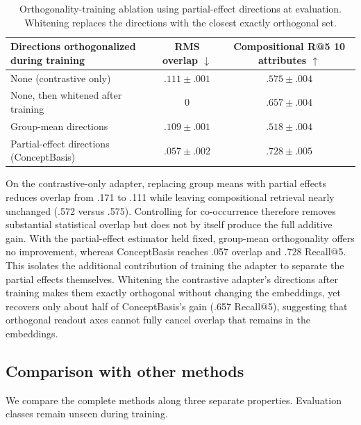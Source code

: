 \documentclass[mlmain,onecolumn]{jmlr}
\begin{document}
\begin{table}[h!]
  \centering
  \caption{Orthogonality-training ablation using partial-effect directions at evaluation. Whitening replaces the directions with the closest exactly orthogonal set.}
  \label{tab:orthogonality-ablation}
  \small
  \begin{tabular}{@{}p{} c c@{}}
    \toprule
    Directions orthogonalized during training &
    \shortstack{RMS\\overlap $\downarrow$} &
    \shortstack{Compositional R@5\\10 attributes $\uparrow$} \\
    \midrule
    None (contrastive only) & $.111 \pm .001$ & $.575 \pm .004$ \\
    None, then whitened after training & $0$ & $.657 \pm .004$ \\
    Group-mean directions & $.109 \pm .001$ & $.518 \pm .004$ \\
    Partial-effect directions (ConceptBasis)
      & $.057 \pm .002$ & $\mathbf{.728 \pm .005}$ \\
    \bottomrule
  \end{tabular}
\end{table}

On the contrastive-only adapter, replacing group means with partial effects reduces overlap from .171 to .111 while leaving compositional retrieval nearly unchanged (.572 versus .575). Controlling for co-occurrence therefore removes substantial statistical overlap but does not by itself produce the full additive gain. With the partial-effect estimator held fixed, group-mean orthogonality offers no improvement, whereas ConceptBasis reaches .057 overlap and .728 Recall@5. This isolates the additional contribution of training the adapter to separate the partial effects themselves. Whitening the contrastive adapter's directions after training makes them exactly orthogonal without changing the embeddings, yet recovers only about half of ConceptBasis's gain (.657 Recall@5), suggesting that orthogonal readout axes cannot fully cancel overlap that remains in the embeddings.

\subsection{Comparison with other methods}

We compare the complete methods along three separate properties. Evaluation classes remain unseen during training.
\end{document}
